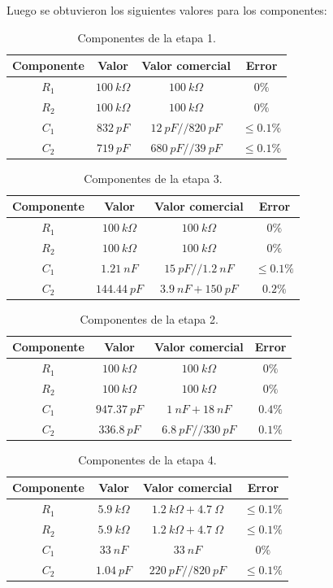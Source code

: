 Luego se obtuvieron los siguientes valores para los componentes:
\begin{multicols}{2}
\begin{table}[H]
\centering
\begin{tabular}{cccc}
\hline
Componente & Valor & Valor comercial & Error \\ \hline
$R_1$ & $100 \ k\Omega$ & $100 \ k\Omega$ & $0\%$ \\
$R_2$ & $100 \ k\Omega$ & $100 \ k\Omega$ & $0\%$\\
$C_1$ & $832 \ pF$ & $12 \ pF // 820 \ pF$ & $\le0.1\%$ \\
$C_2$ & $719 \ pF$ & $680 \ pF // 39 \ pF$ & $\le0.1\%$ \\ \hline
\end{tabular}
\caption{Componentes de la etapa 1.}
\end{table}

\begin{table}[H]
\centering
\begin{tabular}{cccc}
\hline
Componente & Valor & Valor comercial & Error \\ \hline
$R_1$ & $100 \ k\Omega$ & $100 \ k\Omega$ & $0\%$ \\
$R_2$ & $100 \ k\Omega$ & $100 \ k\Omega$ & $0\%$\\
$C_1$ & $1.21 \ nF$ & $15 \ pF // 1.2 \ nF$ & $\le0.1\%$ \\
$C_2$ & $144.44 \ pF$ & $3.9 \ nF + 150 \ pF$ & $0.2\%$ \\ \hline
\end{tabular}
\caption{Componentes de la etapa 3.}
\end{table}
\begin{table}[H]
\centering
\begin{tabular}{cccc}
\hline
Componente & Valor & Valor comercial & Error \\ \hline
$R_1$ & $100 \ k\Omega$ & $100 \ k\Omega$ & $0\%$ \\
$R_2$ & $100 \ k\Omega$ & $100 \ k\Omega$ & $0\%$\\
$C_1$ & $947.37 \ pF$ & $1 \ nF + 18 \ nF$ & $0.4\%$ \\
$C_2$ & $336.8 \ pF$ & $6.8 \ pF // 330 \ pF$ & $0.1\%$ \\ \hline
\end{tabular}
\caption{Componentes de la etapa 2.}
\end{table}
\begin{table}[H]
\centering
\begin{tabular}{cccc}
\hline
Componente & Valor & Valor comercial & Error \\ \hline
$R_1$ & $5.9 \ k\Omega$ & $1.2 \ k\Omega + 4.7 \ \Omega$ & $\le0.1\%$ \\
$R_2$ & $5.9 \ k\Omega$ & $1.2 \ k\Omega + 4.7 \ \Omega$ & $\le0.1\%$\\
$C_1$ & $33 \ nF$ & $33 \ nF$ & $0\%$ \\
$C_2$ & $1.04 \ pF$ & $220 \ pF // 820 \ pF$ & $\le0.1\%$ \\ \hline
\end{tabular}
\caption{Componentes de la etapa 4.}
\end{table}
\end{multicols}

